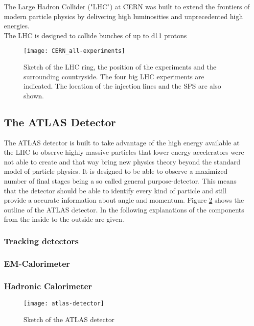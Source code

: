 The Large Hadron Collider ("LHC") at CERN was built to extend the frontiers of modern particle physics by delivering high luminosities and unprecedented high energies.\\
The LHC is designed to collide bunches of up to \num{d11} protons
\begin{figure}[h]
  \centering
  \texttt{[image: CERN\_all-experiments]}
  \caption[Sketch of the LHC ring, the position of the experiments and
  the surrounding countryside.]{Sketch of the LHC ring, the position
    of the experiments and the surrounding countryside. The four big
    LHC experiments are indicated. The location of the injection lines
    and the SPS are also shown.}
  \label{fig:LHC}
\end{figure}


\subsection{The ATLAS Detector}

The ATLAS detector is built to take advantage of the high energy available at the LHC to observe highly massive particles that lower energy accelerators were not able to create and that way bring new physics theory beyond the standard model of particle physics.
It is designed to be able to observe a maximized number of final stages being a so called general purpose-detector. This means that the detector should be able to identify every kind of particle and still provide a accurate information about angle and momentum.
Figure \ref{fig:atlas} shows the outline of the ATLAS detector. In the following explanations of the components from the inside to the outside are given.

\subsubsection{Tracking detectors}

\subsubsection{EM-Calorimeter}

\subsubsection{Hadronic Calorimeter}

\begin{figure}[h]
  \centering
  \texttt{[image: atlas-detector]}
  \caption[Sketch of the ATLAS detector]{Sketch of the ATLAS detector \cite{atlasfigures}}
  \label{fig:atlas}
\end{figure}



